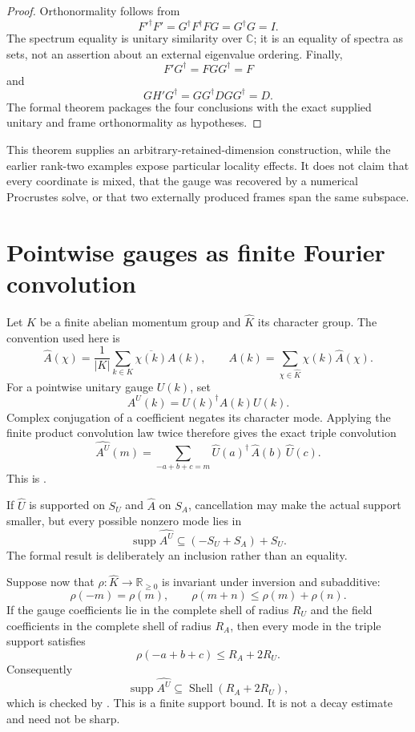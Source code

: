 \begin{proof}
Orthonormality follows from
\[
  F'^\dagger F'=G^\dagger F^\dagger F G=G^\dagger G=I.
\]
The spectrum equality is unitary similarity over $\mathbb C$; it is an equality of spectra as
sets, not an assertion about an external eigenvalue ordering.  Finally,
\[
  F'G^\dagger=FGG^\dagger=F
\]
and
\[
  GH'G^\dagger=GG^\dagger DGG^\dagger=D.
\]
The formal theorem packages the four conclusions with the exact supplied unitary and frame
orthonormality as hypotheses.
\end{proof}

This theorem supplies an arbitrary-retained-dimension construction, while the earlier rank-two
examples expose particular locality effects.  It does not claim that every coordinate is mixed,
that the gauge was recovered by a numerical Procrustes solve, or that two externally produced
frames span the same subspace.

\section{Pointwise gauges as finite Fourier convolution}

Let $K$ be a finite abelian momentum group and $\widehat K$ its character group.  The convention
used here is
\[
  \widehat A(\chi)
    =\frac1{|K|}\sum_{k\in K}\overline{\chi(k)}A(k),
  \qquad
  A(k)=\sum_{\chi\in\widehat K}\chi(k)\widehat A(\chi).
\]
For a pointwise unitary gauge $U(k)$, set
\[
  A^U(k)=U(k)^\dagger A(k)U(k).
\]
Complex conjugation of a coefficient negates its character mode.  Applying the finite product
convolution law twice therefore gives the exact triple convolution
\[
  \widehat{A^U}(m)
   =\sum_{-a+b+c=m}
      \widehat U(a)^\dagger\,\widehat A(b)\,\widehat U(c).
\]
This is .

If $\widehat U$ is supported on $S_U$ and $\widehat A$ on $S_A$, cancellation may make the actual
support smaller, but every possible nonzero mode lies in
\[
  \operatorname{supp}\widehat{A^U}
  \subseteq (-S_U+S_A)+S_U.
\]
The formal result  is deliberately an inclusion rather than an
equality.

Suppose now that $\rho:\widehat K\to\mathbb R_{\geq0}$ is invariant under inversion and
subadditive:
\[
  \rho(-m)=\rho(m),
  \qquad
  \rho(m+n)\leq\rho(m)+\rho(n).
\]
If the gauge coefficients lie in the complete shell of radius $R_U$ and the field coefficients
in the complete shell of radius $R_A$, then every mode in the triple support satisfies
\[
  \rho(-a+b+c)\leq R_A+2R_U.
\]
Consequently
\[
  \operatorname{supp}\widehat{A^U}
  \subseteq \operatorname{Shell}(R_A+2R_U),
\]
which is checked by .  This is a finite support bound.  It is not a
decay estimate and need not be sharp.

